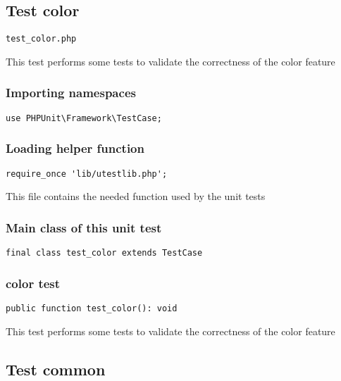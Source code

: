 \documentclass[a4paper]{article}
\begin{document}
\hypertarget{toc83}{}
\subsection{Test color}

\begin{lstlisting}
test_color.php
\end{lstlisting}

This test performs some tests to validate the correctness
of the color feature

\hypertarget{toc84}{}
\subsubsection{Importing namespaces}

\begin{lstlisting}
use PHPUnit\Framework\TestCase;
\end{lstlisting}

\hypertarget{toc85}{}
\subsubsection{Loading helper function}

\begin{lstlisting}
require_once 'lib/utestlib.php';
\end{lstlisting}

This file contains the needed function used by the unit tests

\hypertarget{toc86}{}
\subsubsection{Main class of this unit test}

\begin{lstlisting}
final class test_color extends TestCase
\end{lstlisting}

\hypertarget{toc87}{}
\subsubsection{color test}

\begin{lstlisting}
public function test_color(): void
\end{lstlisting}

This test performs some tests to validate the correctness
of the color feature

\hypertarget{toc88}{}
\subsection{Test common}
\end{document}
